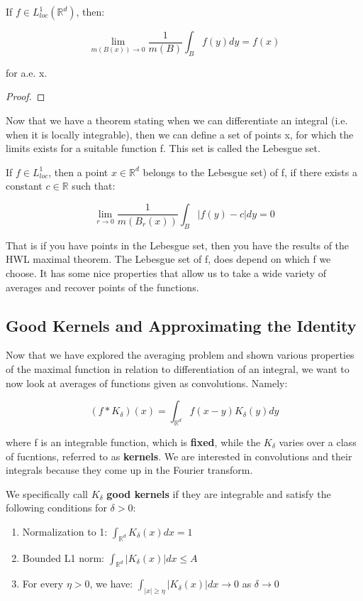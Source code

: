 \documentclass[class=article, crop=false]{standalone}
\begin{document}
			\begin{theorem}
			\label{thm:lebesgue_differentiation}
				If $f \in L^1_{loc}(\mathbb{R}^d)$, then:

					$$\lim_{m(B(x)) \rightarrow 0} \frac{1}{m(B)} \int_B f(y) dy = f(x)$$

				for a.e. x.
			\end{theorem}
			\begin{proof}

			\end{proof}

			Now that we have a theorem stating when we can differentiate an integral (i.e. when it is locally integrable), then we can define a set of points x, for which the limits exists for a suitable function f. This set is called the Lebesgue set.

			\begin{definition}
				If $f \in L^1_{loc}$, then a point $x \in \mathbb{R}^d$ belongs to the Lebesgue set) of f, if there exists a constant $c \in \mathbb{R}$ such that:

					$$\lim_{r \rightarrow 0} \frac{1}{m(B_r(x))} \int_B |f(y) - c| dy = 0$$
			\end{definition}

			That is if you have points in the Lebesgue set, then you have the results of the HWL maximal theorem. The Lebesgue set of f, does depend on which f we choose. It has some nice properties that allow us to take a wide variety of averages and recover points of the functions. 
	\subsection{Good Kernels and Approximating the Identity}
		Now that we have explored the averaging problem and shown various properties of the maximal function in relation to differentiation of an integral, we want to now look at averages of functions given as convolutions. Namely:

			$$(f * K_\delta)(x) = \int_{\mathbb{R}^d} f(x-y)K_\delta(y) dy$$

		where f is an integrable function, which is \textbf{fixed}, while the $K_\delta$ varies over a class of fucntions, referred to as \textbf{kernels}. We are interested in convolutions and their integrals because they come up in the Fourier transform.

		\begin{definition} 
			We specifically call $K_\delta$ \textbf{good kernels} if they are integrable and satisfy the following conditions for $\delta > 0$:

			\begin{enumerate}
				\item Normalization to 1: $\int_{\mathbb{R}^d} K_\delta(x) dx = 1$
				\item Bounded L1 norm: $\int_{\mathbb{R}^d} |K_\delta(x)| dx \le A$ 
				\item For every $\eta > 0$, we have: $\int_{|x| \ge \eta} |K_\delta(x)| dx \rightarrow 0$ as $\delta \rightarrow 0$
			\end{enumerate}
		\end{definition}
\end{document}
